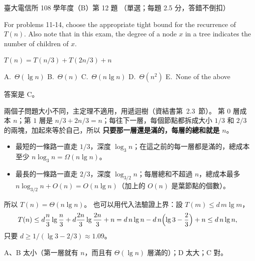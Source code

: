 \begin{pastexam}[label={px:ntu-108-comm-dsab-12}]{臺大電信所 108 學年度（B）第 12 題}
（單選；每題 2.5 分，答錯不倒扣）

For problems 11-14, choose the appropriate tight bound for the recurrence of $T(n)$. Also note
that in this exam, the degree of a node $x$ in a tree indicates the number of children of $x$.

$T(n)=T(n/3)+T(2n/3)+n$

A.~$\Theta(\lg n)$ \qquad B.~$\Theta(n)$ \qquad C.~$\Theta(n\lg n)$ \qquad D.~$\Theta(n^2)$
\qquad E.~None of the above
\end{pastexam}

\begin{pastsoln}
答案是 C。

兩個子問題大小不同，主定理不適用，用遞迴樹（資結書第~2.3~節）。 第 $0$ 層成本 $n$；第 $1$ 層是
$n/3 + 2n/3 = n$；每往下一層，每個節點都拆成大小 $1/3$ 和 $2/3$ 的兩塊，加起來等於自己，所以
\textbf{只要那一層還是滿的，每層的總和就是 $n$}。
\begin{itemize}
\item 最短的一條路一直走 $1/3$，深度 $\log_3 n$；在這之前的每一層都是滿的，總成本至少
$n \log_3 n = \Omega(n \lg n)$。
\item 最長的一條路一直走 $2/3$，深度 $\log_{3/2} n$；每層總和不超過 $n$，總成本最多
$n \log_{3/2} n + O(n) = O(n \lg n)$（加上的 $O(n)$ 是葉節點的個數）。
\end{itemize}
所以 $T(n) = \Theta(n \lg n)$。 也可以用代入法驗證上界：設 $T(m) \le d\,m \lg m$，
\[
T(n) \le d\frac{n}{3}\lg\frac{n}{3} + d\frac{2n}{3}\lg\frac{2n}{3} + n
= d\,n\lg n - d\,n\Bigl(\lg 3 - \frac{2}{3}\Bigr) + n \le d\,n \lg n,
\]
只要 $d \ge 1/(\lg 3 - 2/3) \approx 1.09$。

A、B 太小（第一層就有 $n$，而且有 $\Theta(\lg n)$ 層滿的）；D 太大；C 對。
\end{pastsoln}
